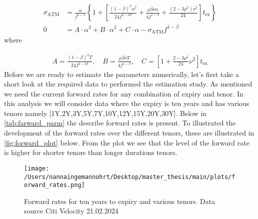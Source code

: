 \begin{align}
    \sigma_{\text{ATM}}  & = \frac{\alpha}{f^{1-\beta}} \left\{ 1 +
     \left[ \frac{(1-\beta)^2 \alpha^2}{24 f^{2-2\beta}} + \frac{\rho \beta \nu \alpha}{4 f^{1-\beta}}
      + \frac{(2-3\rho^2) \nu^2}{24} \right] t_{\text{ex}} \right\} \label{sigma_atm} \\
      0 &= A \cdot \alpha^3 + B \cdot \alpha^2 + C \cdot \alpha - \sigma_{\text{ATM}} f^{1-\beta}
\end{align}
where

\begin{align}
    A = \frac{(1-\beta)^2 T}{24 f^{2-2\beta}},
    \quad B = \frac{\rho \beta \nu T}{4 f^{1-\beta}},
    \quad C = \left[ 1 + \frac{2-3\rho^2}{24} \nu^2 \right] t_{\text{ex}} \label{ABC}
\end{align}
Before we are ready to estimate the parameters numerically, let's first take a short look at the required 
data to performed the estimation study. As mentioned we need the current forward rates for any combination 
of expiry and tenor. In this analysis we will consider data where the expiry is ten years and has various tenors 
namely [1Y,2Y,3Y,5Y,7Y,10Y,12Y,15Y,20Y,30Y]. Below in \autoref{tab:farward_parm} the describe forward rates is 
present. To illustrated the development of the forward rates over the different tenors, these are illustrated
in \autoref{fig:forward_plot} below. From the plot we see that the level of the forward rate is higher for
shorter tenors than longer durations tenors.
\\
\begin{table}[H]
    \centering
    \caption{Forward rates for ten years to expiry and various tenors. Data source Citi Velocity 21.02.2024}
    \label{tab:farward_parm}
\end{table}
\begin{figure}[H]
    \centering
    \texttt{[image: /Users/nannaingemannohrt/Desktop/master\_thesis/main/plots/forward\_rates.png]}
    \caption{Forward rates for ten years to expiry and various tenors. Data source Citi Velocity 21.02.2024}
    \label{fig:forward_plot}
\end{figure}
